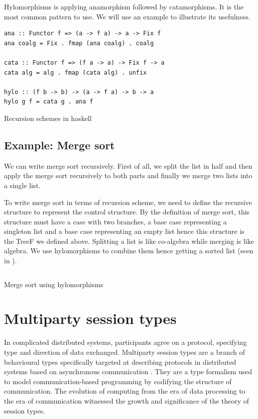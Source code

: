 Hylomorphisms is applying anamorphism followed by catamorphisms. It is the most common pattern to use. We will use an example to illustrate its usefulness. 
\begin{code}
\begin{verbatim}
ana :: Functor f => (a -> f a) -> a -> Fix f
ana coalg = Fix . fmap (ana coalg) . coalg

cata :: Functor f => (f a -> a) -> Fix f -> a
cata alg = alg . fmap (cata alg) . unfix

hylo :: (f b -> b) -> (a -> f a) -> b -> a 
hylo g f = cata g . ana f 
\end{verbatim}
\caption{Recursion schemes in haskell} \label{p:pal:c3}
\end{code}

\subsection{Example: Merge sort} \label{b:rs:ex}
We can write merge sort recursively. First of all, we split the list in half and then apply the merge sort recursively to both parts and finally we merge two lists into a single list. 

To write merge sort in terms of recursion scheme, we need to define the recursive structure to represent the control structure. By the definition of merge sort, this structure must have a case with two branches, a base case representing a singleton list and a base case representing an empty list hence this structure is the TreeF we defined above. Splitting a list is like co-algebra while merging is like algebra. We use hylomorphisms to combine them hence getting a sorted list (seen in ).
\begin{code}
\inputminted{haskell}{project/pal-ms.hs}
\caption{Merge sort using hylomorphisms} \label{p:pal:c4}
\end{code}
\section{Multiparty session types} \label{b:mpst}
In complicated distributed systems, participants agree on a protocol, specifying type and direction of data exchanged. Multiparty session types are a branch of behavioural types specifically targeted at describing protocols in distributed systems based on asynchronous communication \cite{coppoGentleIntroductionMultiparty2015}. They are a type formalism used to model communication-based programming by codifying the structure of communication. The evolution of computing from the era of data processing to the era of communication witnessed the growth and significance of the theory of session types.

